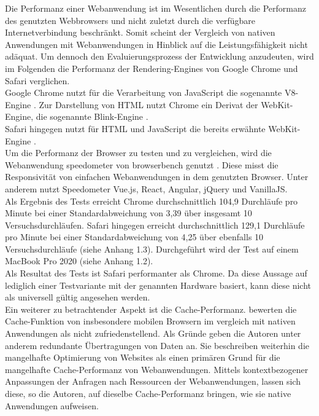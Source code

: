 \documentclass[a4paper]{scrartcl}
\begin{document}
Die Performanz einer Webanwendung ist im Wesentlichen durch die Performanz des genutzten Webbrowsers und nicht zuletzt durch die verfügbare Internetverbindung beschränkt. Somit scheint der Vergleich von nativen Anwendungen mit Webanwendungen in Hinblick auf die Leistungsfähigkeit nicht adäquat. Um dennoch den Evaluierungsprozess der Entwicklung anzudeuten, wird im Folgenden die Performanz der Rendering-Engines von Google Chrome und Safari verglichen. \\ 
Google Chrome nutzt für die Verarbeitung von JavaScript die sogenannte V8-Engine \autocite{v8_Engine}. Zur Darstellung von HTML nutzt Chrome ein Derivat der WebKit-Engine, die sogenannte Blink-Engine \autocite{Blink_Rendering}. \\
Safari hingegen nutzt für HTML und JavaScript die bereits erwähnte WebKit-Engine \autocite{WebKit}. \\
Um die Performanz der Browser zu testen und zu vergleichen, wird die Webanwendung speedometer von browserbench genutzt \autocite{Speedometer}. Diese misst die Responsivität von einfachen Webanwendungen in dem genutzten Browser. Unter anderem nutzt Speedometer Vue.js, React, Angular, jQuery und VanillaJS. \\
Als Ergebnis des Tests erreicht Chrome durchschnittlich 104,9 Durchläufe pro Minute bei einer Standardabweichung von 3,39 über insgesamt 10 Versuchsdurchläufen. Safari hingegen erreicht durchschnittlich 129,1 Durchläufe pro Minute bei einer Standardabweichung von 4,25 über ebenfalls 10 Versuchsdurchläufe (siehe Anhang 1.3). Durchgeführt wird der Test auf einem MacBook Pro 2020 (siehe Anhang 1.2). \\
Als Resultat des Tests ist Safari performanter als Chrome. Da diese Aussage auf lediglich einer Testvariante mit der genannten Hardware basiert, kann diese nicht als universell gültig angesehen werden. \\

Ein weiterer zu betrachtender Aspekt ist die Cache-Performanz. \textcite[999]{native_vs_web} bewerten die Cache-Funktion von insbesondere mobilen Browsern im vergleich mit nativen Anwendungen als nicht zufriedenstellend. Als Gründe geben die Autoren unter anderem redundante Übertragungen von Daten an. Sie beschreiben weiterhin die mangelhafte Optimierung von Websites als einen primären Grund für die mangelhafte Cache-Performanz von Webanwendungen. Mittels kontextbezogener Anpassungen der Anfragen nach Ressourcen der Webanwendungen, lassen sich diese, so die Autoren, auf dieselbe Cache-Performanz bringen, wie sie native Anwendungen aufweisen. \\
\end{document}
